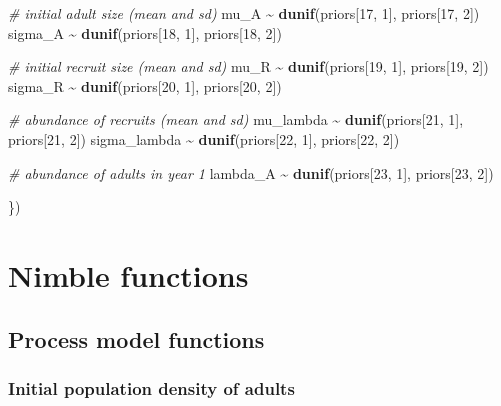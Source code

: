 \documentclass[
]{article}
\newenvironment{Shaded}{\begin{snugshade}}{\end{snugshade}}
\newcommand{\CommentTok}[1]{\textcolor[rgb]{0.56,0.35,0.01}{\textit{#1}}}
\newcommand{\DecValTok}[1]{\textcolor[rgb]{0.00,0.00,0.81}{#1}}
\newcommand{\FunctionTok}[1]{\textcolor[rgb]{0.13,0.29,0.53}{\textbf{#1}}}
\newcommand{\NormalTok}[1]{#1}
\newcommand{\SpecialCharTok}[1]{\textcolor[rgb]{0.81,0.36,0.00}{\textbf{#1}}}
\begin{document}
\begin{Shaded}
\begin{Highlighting}[]
  \CommentTok{\# initial adult size (mean and sd)}
\NormalTok{  mu\_A }\SpecialCharTok{\textasciitilde{}} \FunctionTok{dunif}\NormalTok{(priors[}\DecValTok{17}\NormalTok{, }\DecValTok{1}\NormalTok{], priors[}\DecValTok{17}\NormalTok{, }\DecValTok{2}\NormalTok{])}
\NormalTok{  sigma\_A }\SpecialCharTok{\textasciitilde{}} \FunctionTok{dunif}\NormalTok{(priors[}\DecValTok{18}\NormalTok{, }\DecValTok{1}\NormalTok{], priors[}\DecValTok{18}\NormalTok{, }\DecValTok{2}\NormalTok{])}

  \CommentTok{\# initial recruit size (mean and sd)}
\NormalTok{  mu\_R }\SpecialCharTok{\textasciitilde{}} \FunctionTok{dunif}\NormalTok{(priors[}\DecValTok{19}\NormalTok{, }\DecValTok{1}\NormalTok{], priors[}\DecValTok{19}\NormalTok{, }\DecValTok{2}\NormalTok{])}
\NormalTok{  sigma\_R }\SpecialCharTok{\textasciitilde{}} \FunctionTok{dunif}\NormalTok{(priors[}\DecValTok{20}\NormalTok{, }\DecValTok{1}\NormalTok{], priors[}\DecValTok{20}\NormalTok{, }\DecValTok{2}\NormalTok{])}

  \CommentTok{\# abundance of recruits (mean and sd)}
\NormalTok{  mu\_lambda }\SpecialCharTok{\textasciitilde{}} \FunctionTok{dunif}\NormalTok{(priors[}\DecValTok{21}\NormalTok{, }\DecValTok{1}\NormalTok{], priors[}\DecValTok{21}\NormalTok{, }\DecValTok{2}\NormalTok{])}
\NormalTok{  sigma\_lambda }\SpecialCharTok{\textasciitilde{}} \FunctionTok{dunif}\NormalTok{(priors[}\DecValTok{22}\NormalTok{, }\DecValTok{1}\NormalTok{], priors[}\DecValTok{22}\NormalTok{, }\DecValTok{2}\NormalTok{])}

  \CommentTok{\# abundance of adults in year 1}
\NormalTok{  lambda\_A }\SpecialCharTok{\textasciitilde{}} \FunctionTok{dunif}\NormalTok{(priors[}\DecValTok{23}\NormalTok{, }\DecValTok{1}\NormalTok{], priors[}\DecValTok{23}\NormalTok{, }\DecValTok{2}\NormalTok{])}
  
  
\NormalTok{\})}
\end{Highlighting}
\end{Shaded}

\section{Nimble functions}\label{nimble-functions}

\subsection{Process model functions}\label{process-model-functions}

\subsubsection{Initial population density of
adults}\label{initial-population-density-of-adults}
\end{document}
